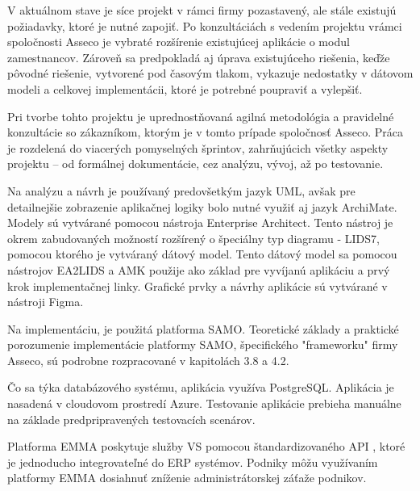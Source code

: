 
V aktuálnom stave je síce projekt v rámci firmy pozastavený, ale stále existujú požiadavky, ktoré je nutné zapojiť. Po konzultáciách s vedením projektu vrámci spoločnosti Asseco je vybraté rozšírenie existujúcej aplikácie o modul zamestnancov. Zároveň sa predpokladá aj úprava existujúceho riešenia, keďže pôvodné riešenie, vytvorené pod časovým tlakom, vykazuje nedostatky v dátovom modeli a celkovej implementácii, ktoré je potrebné poupraviť a vylepšiť.

Pri tvorbe tohto projektu je uprednostňovaná agilná metodológia a pravidelné konzultácie so zákazníkom, ktorým je v tomto prípade spoločnosť Asseco. Práca je rozdelená do viacerých pomyselných šprintov, zahrňujúcich všetky aspekty projektu -- od formálnej dokumentácie, cez analýzu, vývoj, až po testovanie.

Na analýzu a návrh je používaný predovšetkým jazyk UML, avšak pre detailnejšie zobrazenie aplikačnej logiky bolo nutné využiť aj jazyk ArchiMate. Modely sú vytvárané pomocou nástroja Enterprise Architect. Tento nástroj je okrem zabudovaných možností rozšírený o špeciálny typ diagramu - LIDS7, pomocou ktorého je vytváraný dátový model. Tento dátový model sa pomocou nástrojov EA2LIDS a AMK použije ako základ pre vyvíjanú aplikáciu a prvý krok implementačnej linky. Grafické prvky a návrhy aplikácie sú vytvárané v nástroji Figma.

Na implementáciu, je použitá platforma SAMO. Teoretické základy a praktické porozumenie implementácie platformy SAMO, špecifického "frameworku" firmy Asseco, sú podrobne rozpracované v kapitolách 3.8 a 4.2. 

Čo sa týka databázového systému, aplikácia využíva PostgreSQL. Aplikácia je nasadená v cloudovom prostredí Azure. Testovanie aplikácie prebieha manuálne na základe predpripravených testovacích scenárov.



Platforma EMMA poskytuje služby VS pomocou štandardizovaného API
, ktoré je jednoducho integrovateľné do ERP systémov. Podniky môžu využívaním platformy EMMA dosiahnuť zníženie administrátorskej záťaže podnikov. 

